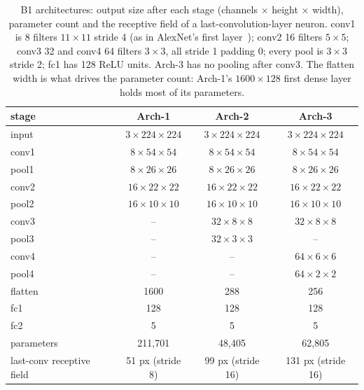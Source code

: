 \documentclass[11pt,a4paper]{article}
\begin{document}
\begin{table}[H]\centering\small\begin{tabular}{@{}lccc@{}}\toprule stage & Arch-1 & Arch-2 & Arch-3 \\ \midrule
input & $3\times224\times224$ & $3\times224\times224$ & $3\times224\times224$ \\
conv1 & $8\times54\times54$ & $8\times54\times54$ & $8\times54\times54$ \\
pool1 & $8\times26\times26$ & $8\times26\times26$ & $8\times26\times26$ \\
conv2 & $16\times22\times22$ & $16\times22\times22$ & $16\times22\times22$ \\
pool2 & $16\times10\times10$ & $16\times10\times10$ & $16\times10\times10$ \\
conv3 & -- & $32\times8\times8$ & $32\times8\times8$ \\
pool3 & -- & $32\times3\times3$ & -- \\
conv4 & -- & -- & $64\times6\times6$ \\
pool4 & -- & -- & $64\times2\times2$ \\
flatten & 1600 & 288 & 256 \\
fc1 & 128 & 128 & 128 \\
fc2 & 5 & 5 & 5 \\
\midrule parameters & 211,701 & 48,405 & 62,805 \\
last-conv receptive field & 51 px (stride 8) & 99 px (stride 16) & 131 px (stride 16) \\
\bottomrule\end{tabular}
\caption{B1 architectures: output size after each stage (channels $\times$ height $\times$ width),
parameter count and the receptive field of a last-convolution-layer neuron.
conv1 is 8 filters $11\times11$ stride 4 (as in AlexNet's first layer~\cite{alexnet}); conv2 16 filters $5\times5$; conv3 32 and conv4 64 filters
$3\times3$, all stride 1 padding 0; every pool is $3\times3$ stride 2; fc1 has 128 ReLU units.  Arch-3
has no pooling after conv3.  The flatten width is what drives the parameter count: Arch-1's
$1600\times128$ first dense layer holds most of its parameters.}\label{tab:b1sizes}
\end{table}
\end{document}
